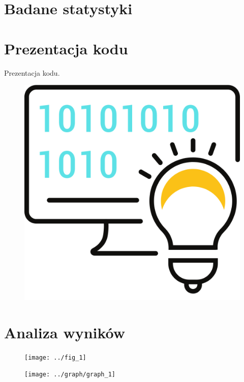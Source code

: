 \documentclass{beamer}
\begin{document}
\section{Badane statystyki}
\begin{frame}
		
\end{frame}
\begin{frame}
	
\end{frame}

\section{Prezentacja kodu}
\begin{frame}
	\begin{center}
		\huge{Prezentacja kodu.}
	\end{center}
	\begin{figure}
		\centering
		\includegraphics[width=0.5\linewidth]{../images/rys_6}
		\label{fig:rys6}
	\end{figure}
\end{frame}

\section{Analiza wyników}
\begin{frame}
\begin{figure}
	\centering
	\texttt{[image: ../fig\_1]}
\end{figure}
\end{frame}

\begin{frame}
\begin{figure}
	\centering
	\texttt{[image: ../graph/graph\_1]}
\end{figure}
\end{frame}
\end{document}
